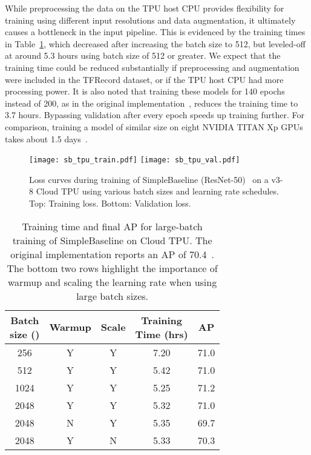 \documentclass[final]{cvpr}
\begin{document}
While preprocessing the data on the TPU host CPU provides flexibility for training using different input resolutions and data augmentation, it ultimately causes a bottleneck in the input pipeline. This is evidenced by the training times in Table~\ref{tab:sb_tpu}, which decreased after increasing the batch size to 512, but leveled-off at around 5.3 hours using batch size of 512 or greater. We expect that the training time could be reduced substantially if preprocessing and augmentation were included in the TFRecord dataset, or if the TPU host CPU had more processing power. It is also noted that training these models for 140 epochs instead of 200, as in the original implementation~\cite{xiao2018simple}, reduces the training time to 3.7 hours. Bypassing validation after every epoch speeds up training further. For comparison, training a model of similar size on eight NVIDIA TITAN Xp GPUs takes about 1.5 days~\cite{chen2018cascaded}. 

\begin{figure}
\centering
    \texttt{[image: sb\_tpu\_train.pdf]}
    \texttt{[image: sb\_tpu\_val.pdf]}
\caption{Loss curves during training of SimpleBaseline (ResNet-50)~\cite{xiao2018simple} on a v3-8 Cloud TPU using various batch sizes and learning rate schedules. Top: Training loss. Bottom: Validation loss.}
\vspace{-4pt}
\label{fig:sb_tpu}
\end{figure}

\begin{table}
\footnotesize
\centering
\begin{tabular}{c|c|c|c|c}
	\hline\textbf{}
	\makecell{Batch\\size ()} & Warmup & Scale  & \makecell{Training\\Time (hrs)} & AP\\
	\hline
	256 & Y & Y & 7.20 & 71.0\\
	512 & Y & Y & 5.42 & 71.0\\
	1024 & Y & Y & 5.25 & 71.2\\
	2048 & Y & Y & 5.32 & 71.0\\
	\hline
	2048 & N & Y & 5.35 & 69.7\\
	2048 & Y & N & 5.33 & 70.3\\
	\hline
\end{tabular}
\vspace{2pt}
\caption{Training time and final AP for large-batch training of SimpleBaseline on Cloud TPU. The original implementation reports an AP of 70.4~\cite{xiao2018simple}. The bottom two rows highlight the importance of warmup and scaling the learning rate when using large batch sizes.}
\vspace{-8pt}
\label{tab:sb_tpu}
\end{table}
\end{document}
